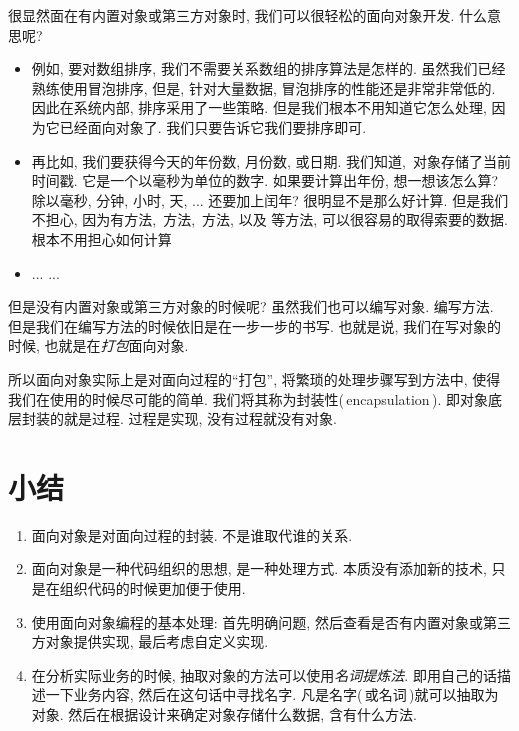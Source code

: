 很显然面在有内置对象或第三方对象时, 我们可以很轻松的面向对象开发. 什么意思呢?

\begin{itemize}
\item 例如, 要对数组排序, 我们不需要关系数组的排序算法是怎样的. 虽然我们已经熟练使用冒泡排序, 
      但是, 针对大量数据, 冒泡排序的性能还是非常非常低的. 因此在系统内部, 排序采用了一些策略.
      但是我们根本不用知道它怎么处理, 因为它已经面向对象了. 我们只要告诉它我们要排序即可.
\item 再比如, 我们要获得今天的年份数, 月份数, 或日期. 我们知道, 
      \,对象存储了当前时间戳. 它是一个以毫秒为单位的数字. 如果要计算出年份,
      想一想该怎么算? 除以毫秒, 分钟, 小时, 天, ... 还要加上闰年? 很明显不是那么好计算. 
      但是我们不担心, 因为有方法, \,方法, \,方法,
      以及\,\,等方法, 可以很容易的取得索要的数据. 根本不用担心如何计算
\item ... ...
\end{itemize}

但是没有内置对象或第三方对象的时候呢? 虽然我们也可以编写对象. 编写方法. 但是我们在编写方法的时候依旧是在一步一步的书写.
也就是说, 我们在写对象的时候, 也就是在\emph{打包}面向对象.

所以面向对象实际上是对面向过程的``打包'', 将繁琐的处理步骤写到方法中, 使得我们在使用的时候尽可能的简单. 
我们将其称为封装性(\,encapsulation\,). 即对象底层封装的就是过程. 过程是实现, 没有过程就没有对象.




\section{小结}

\begin{enumerate}
\item 面向对象是对面向过程的封装. 不是谁取代谁的关系.
\item 面向对象是一种代码组织的思想, 是一种处理方式. 本质没有添加新的技术, 只是在组织代码的时候更加便于使用.
\item 使用面向对象编程的基本处理: 首先明确问题, 然后查看是否有内置对象或第三方对象提供实现, 最后考虑自定义实现.
\item 在分析实际业务的时候, 抽取对象的方法可以使用\emph{名词提炼法}. 即用自己的话描述一下业务内容, 
      然后在这句话中寻找名字. 凡是名字(\,或名词\,)就可以抽取为对象. 然后在根据设计来确定对象存储什么数据, 
      含有什么方法.
\end{enumerate}
















